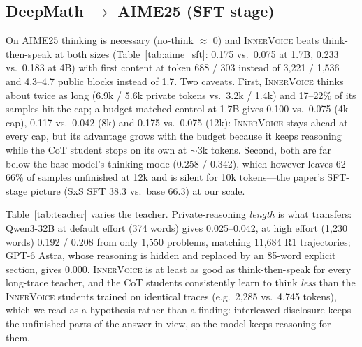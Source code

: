 \documentclass[letterpaper]{article} %
\newcommand{\iv}{\textsc{InnerVoice}}
\begin{document}
\subsection{DeepMath $\rightarrow$ AIME25 (SFT stage)}

On AIME25 thinking is necessary (no-think $\approx$ 0) and \iv{} beats think-then-speak at both sizes (Table~\ref{tab:aime_sft}: 0.175 vs.\ 0.075 at 1.7B, 0.233 vs.\ 0.183 at 4B) with first content at token 688 / 303 instead of 3,221 / 1,536 and 4.3--4.7 public blocks instead of 1.7. Two caveats. First, \iv{} thinks about twice as long (6.9k / 5.6k private tokens vs.\ 3.2k / 1.4k) and 17--22\% of its samples hit the cap; a budget-matched control at 1.7B gives 0.100 vs.\ 0.075 (4k cap), 0.117 vs.\ 0.042 (8k) and 0.175 vs.\ 0.075 (12k): \iv{} stays ahead at every cap, but its advantage grows with the budget because it keeps reasoning while the CoT student stops on its own at $\sim$3k tokens. Second, both are far below the base model's thinking mode (0.258 / 0.342), which however leaves 62--66\% of samples unfinished at 12k and is silent for 10k tokens---the paper's SFT-stage picture (SxS SFT 38.3 vs.\ base 66.3) at our scale.


Table~\ref{tab:teacher} varies the teacher. Private-reasoning \emph{length} is what transfers: Qwen3-32B at default effort (374 words) gives 0.025--0.042, at high effort (1,230 words) 0.192 / 0.208 from only 1,550 problems, matching 11,684 R1 trajectories; GPT-6 Astra, whose reasoning is hidden and replaced by an 85-word explicit section, gives 0.000. \iv{} is at least as good as think-then-speak for every long-trace teacher, and the CoT students consistently learn to think \emph{less} than the \iv{} students trained on identical traces (e.g.\ 2,285 vs.\ 4,745 tokens), which we read as a hypothesis rather than a finding: interleaved disclosure keeps the unfinished parts of the answer in view, so the model keeps reasoning for them.
\end{document}
